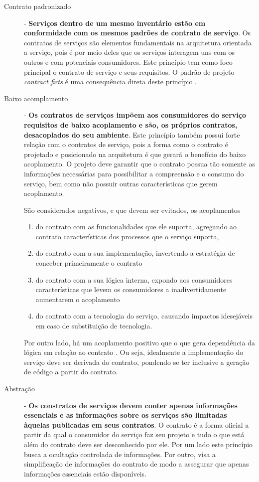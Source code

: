 \begin{description}
\item[Contrato padronizado] - \textbf{Serviços dentro de um mesmo inventário
estão em conformidade com os mesmos padrões de contrato de serviço}. 
Os contratos de serviços são elementos fundamentais na arquitetura orientada
a serviço, pois é por meio deles que os serviços interagem uns com os outros e
com potenciais consumidores. Este princípio tem como foco principal o contrato de serviço e seus requisitos. O padrão de projeto \textit{contract firts} é
uma consequência direta deste princípio \cite{erl2009web}. 

\item[Baixo acomplamento] - \textbf{Os contratos de serviços impõem aos
consumidores do serviço requisitos de baixo acoplamento e são, os próprios
contratos, desacoplados do seu ambiente}. 
Este princípio também possui forte relação com o contratos de serviço, pois a
forma como o contrato é projetado e posicionado na arquitetura é que gerará o
benefício do baixo acoplamento. O projeto deve garantir que o contrato
possua tão somente as informações necessárias para possibilitar a compreensão e
o consumo do serviço, bem como não possuir outras características que gerem
acoplamento.

São considerados negativos, e que devem ser evitados, os acoplamentos  
\begin{enumerate}[label=(\alph*)] 
\item do contrato com as funcionalidades que ele suporta, agregando ao
contrato características dos processos que o serviço suporta,
\item do contrato com a sua implementação, invertendo a estratégia de conceber
primeiramente o contrato
\item do contrato com a sua lógica interna, expondo aos consumidores
características que levem os consumidores a inadivertidamente aumentarem o
acoplamento
\item do contrato com a tecnologia do serviço, causando impactos idesejáveis em
caso de substituição de tecnologia.
\end{enumerate}

Por outro lado, há um acoplamento positivo que o que gera dependência da
lógica em relação ao contrato \cite{erl2009web}. Ou seja, idealmente a
implementação do serviço deve ser derivada do contrato, pondendo se ter inclusive a geração de código a
partir do contrato.


\item[Abstração] - \textbf{Os constratos de serviços devem conter apenas
informações essenciais e as informações sobre os serviços são limitadas àquelas
publicadas em seus contratos}. O contrato é a forma oficial a partir da qual o
consumidor do serviço faz seu projeto e tudo o que está além do contrato deve
ser desconhecido por ele. Por um lado este princípio busca a ocultação
controlada de informações. Por outro, visa a simplificação de informações do
contrato de modo a assegurar que apenas informações essenciais estão
disponíveis.



\end{description}
